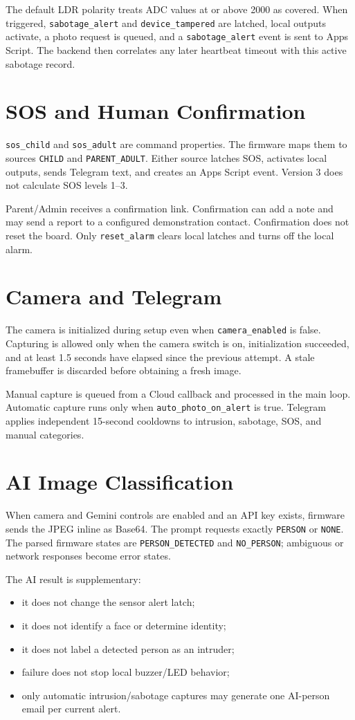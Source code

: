 \documentclass[11pt,a4paper]{report}
\begin{document}
The default LDR polarity treats ADC values at or above 2000 as covered. When
triggered, \texttt{sabotage\_alert} and \texttt{device\_tampered} are latched,
local outputs activate, a photo request is queued, and a
\texttt{sabotage\_alert} event is sent to Apps Script. The backend then
correlates any later heartbeat timeout with this active sabotage record.

\section{SOS and Human Confirmation}
\texttt{sos\_child} and \texttt{sos\_adult} are command properties. The
firmware maps them to sources \texttt{CHILD} and \texttt{PARENT\_ADULT}.
Either source latches SOS, activates local outputs, sends Telegram text, and
creates an Apps Script event. Version 3 does not calculate SOS levels 1--3.

Parent/Admin receives a confirmation link. Confirmation can add a note and may
send a report to a configured demonstration contact. Confirmation does not
reset the board. Only \texttt{reset\_alarm} clears local latches and turns off
the local alarm.

\section{Camera and Telegram}
The camera is initialized during setup even when \texttt{camera\_enabled} is
false. Capturing is allowed only when the camera switch is on, initialization
succeeded, and at least 1.5 seconds have elapsed since the previous attempt.
A stale framebuffer is discarded before obtaining a fresh image.

Manual capture is queued from a Cloud callback and processed in the main loop.
Automatic capture runs only when \texttt{auto\_photo\_on\_alert} is true.
Telegram applies independent 15-second cooldowns to intrusion, sabotage, SOS,
and manual categories.

\section{AI Image Classification}
When camera and Gemini controls are enabled and an API key exists, firmware
sends the JPEG inline as Base64. The prompt requests exactly \texttt{PERSON}
or \texttt{NONE}. The parsed firmware states are
\texttt{PERSON\_DETECTED} and \texttt{NO\_PERSON}; ambiguous or network
responses become error states.

The AI result is supplementary:
\begin{itemize}
  \item it does not change the sensor alert latch;
  \item it does not identify a face or determine identity;
  \item it does not label a detected person as an intruder;
  \item failure does not stop local buzzer/LED behavior;
  \item only automatic intrusion/sabotage captures may generate one
        AI-person email per current alert.
\end{itemize}
\end{document}
